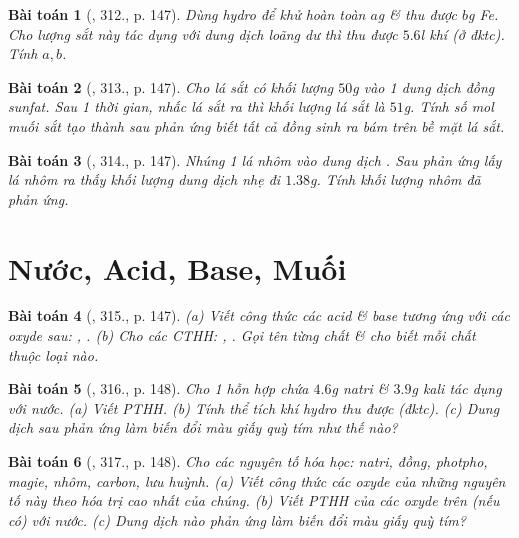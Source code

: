 \documentclass{article}
\newtheorem{baitoan}{Bài toán}
\begin{document}
\begin{baitoan}[\cite{An_400_BT_Hoa_Hoc_8_2020}, 312., p. 147]
	Dùng hydro để khử hoàn toàn $a$\emph{g} \emph{} \& thu được $b$\emph{g Fe}. Cho lượng sắt này tác dụng với dung dịch \emph{} loãng dư thì thu được $5.6$\emph{l} khí \emph{} (ở đktc). Tính $a,b$.
\end{baitoan}

\begin{baitoan}[\cite{An_400_BT_Hoa_Hoc_8_2020}, 313., p. 147]
	Cho lá sắt có khối lượng $50$\emph{g} vào 1 dung dịch đồng sunfat. Sau 1 thời gian, nhấc lá sắt ra thì khối lượng lá sắt là $51$\emph{g}. Tính số \emph{mol} muối sắt tạo thành sau phản ứng biết tất cả đồng sinh ra bám trên bề mặt lá sắt.
\end{baitoan}

\begin{baitoan}[\cite{An_400_BT_Hoa_Hoc_8_2020}, 314., p. 147]
	Nhúng 1 lá nhôm vào dung dịch \emph{}. Sau phản ứng lấy lá nhôm ra thấy khối lượng dung dịch nhẹ đi $1.38$\emph{g}. Tính khối lượng nhôm đã phản ứng.
\end{baitoan}


\section{Nước, Acid, Base, Muối}

\begin{baitoan}[\cite{An_400_BT_Hoa_Hoc_8_2020}, 315., p. 147]
	(a) Viết công thức các acid \& base tương ứng với các oxyde sau: \emph{, }. (b) Cho các CTHH: \emph{, }. Gọi tên từng chất \& cho biết mỗi chất thuộc loại nào.
\end{baitoan}

\begin{baitoan}[\cite{An_400_BT_Hoa_Hoc_8_2020}, 316., p. 148]
	Cho 1 hỗn hợp chứa $4.6$\emph{g} natri \& $3.9$\emph{g} kali tác dụng với nước. (a) Viết PTHH. (b) Tính thể tích khí hydro thu được (đktc). (c) Dung dịch sau phản ứng làm biến đổi màu giấy quỳ tím như thế nào?
\end{baitoan}

\begin{baitoan}[\cite{An_400_BT_Hoa_Hoc_8_2020}, 317., p. 148]
	Cho các nguyên tố hóa học: natri, đồng, photpho, magie, nhôm, carbon, lưu huỳnh. (a) Viết công thức các oxyde của những nguyên tố này theo hóa trị cao nhất của chúng. (b) Viết PTHH của các oxyde trên (nếu có) với nước. (c) Dung dịch nào phản ứng làm biến đổi màu giấy quỳ tím?
\end{baitoan}
\end{document}
